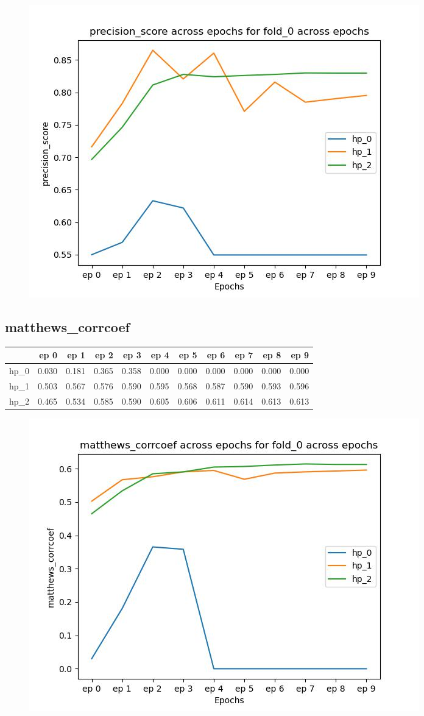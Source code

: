 \documentclass{article}
\begin{document}
\begin{figure}[H]
\includegraphics[scale = 0.75]{fold_0/precision_score}
\end{figure}
\subsection{matthews\_corrcoef}
\begin{tabular}{lrrrrrrrrrr}
\toprule
{} &   ep 0 &   ep 1 &   ep 2 &   ep 3 &   ep 4 &   ep 5 &   ep 6 &   ep 7 &   ep 8 &   ep 9 \\
\midrule
hp\_0 &  0.030 &  0.181 &  0.365 &  0.358 &  0.000 &  0.000 &  0.000 &  0.000 &  0.000 &  0.000 \\
hp\_1 &  0.503 &  0.567 &  0.576 &  0.590 &  0.595 &  0.568 &  0.587 &  0.590 &  0.593 &  0.596 \\
hp\_2 &  0.465 &  0.534 &  0.585 &  0.590 &  0.605 &  0.606 &  0.611 &  0.614 &  0.613 &  0.613 \\
\bottomrule
\end{tabular}

\begin{figure}[H]
\includegraphics[scale = 0.75]{fold_0/matthews_corrcoef}
\end{figure}
\end{document}
